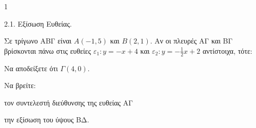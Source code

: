 \begin{ylh}{1}
    \item 2.1. Εξίσωση Ευθείας.
\end{ylh}
Σε τρίγωνο ΑΒΓ είναι $A(-1, 5)$ και $B(2, 1)$. Αν οι πλευρές ΑΓ και ΒΓ βρίσκονται πάνω στις ευθείες $\varepsilon_1 : y = -x + 4$ και $\varepsilon_2 : y = -\frac{1}{2}x + 2$ αντίστοιχα, τότε:
\begin{alist}
\item Να αποδείξετε ότι $\Gamma(4, 0)$. 
\item Να βρείτε:
    \begin{rlist}
    \item τον συντελεστή διεύθυνσης της ευθείας ΑΓ 
    \item την εξίσωση του ύψους ΒΔ. 
    \end{rlist}
\end{alist}